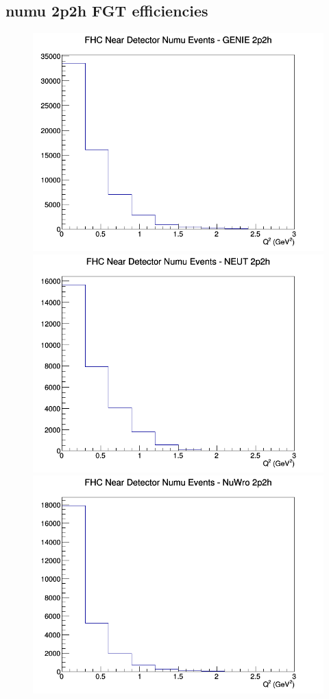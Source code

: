 \documentclass[12pt]{article}
\begin{document}
\subsection{numu 2p2h FGT efficiencies}
\begin{figure}[h]
\includegraphics[width=\linewidth]{eff_Q2/FGT/2p2h_FHC_ND_numu_Q2_GENIE.png}
\endminipage
{}
\includegraphics[width=\linewidth]{eff_Q2/FGT/2p2h_FHC_ND_numu_Q2_NEUT.png}
\endminipage
{}
\includegraphics[width=\linewidth]{eff_Q2/FGT/2p2h_FHC_ND_numu_Q2_NuWro.png}

\end{figure}
\end{document}
